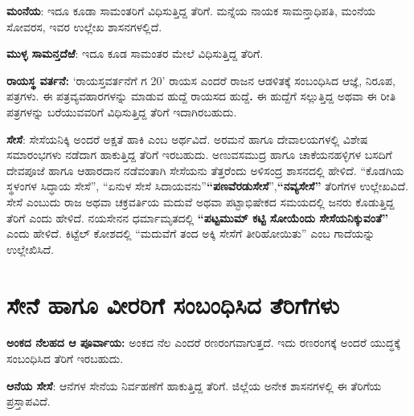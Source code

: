 \textbf{ಮಂನೆಯ}: ಇದೂ ಕೂಡಾ ಸಾಮಂತರಿಗೆ ವಿಧಿಸುತ್ತಿದ್ದ ತೆರಿಗೆ. ಮನ್ನೆಯ ನಾಯಕ ಸಾಮನ್ತಾಧಿಪತಿ, ಮಂನೆಯ ಸೋವರಸ, ಇವರ ಉಲ್ಲೇಖ ಶಾಸನಗಳಲ್ಲಿದೆ.

\textbf{ಮುಳ್ಳ ಸಾಮನ್ತದೆಱೆ}: ಇದೂ ಕೂಡ ಸಾಮಂತರ ಮೇಲೆ ವಿಧಿಸುತ್ತಿದ್ದ ತೆರಿಗೆ.

\textbf{ರಾಯಸ್ಥ ವರ್ತನೆ:} ‘ರಾಯಸ್ತವರ್ತನೆಗೆ ಗ 20’ ರಾಯಸ ಎಂದರೆ ರಾಜನ ಆಡಳಿತಕ್ಕೆ ಸಂಬಂಧಿಸಿದ ಆಜ್ಞೆ, ನಿರೂಪ, ಪತ್ರಗಳು. ಈ ಪತ್ರವ್ಯವಹಾರಗಳನ್ನು ಮಾಡುವ ಹುದ್ದೆ ರಾಯಸದ ಹುದ್ದೆ\textbf{. } ಈ ಹುದ್ದೆಗೆ ಸಲ್ಲುತ್ತಿದ್ದ ಅಥವಾ ಈ ರೀತಿ ಪತ್ರಗಳನ್ನು ಬರೆಯುವವರಿಗೆ ವಿಧಿಸುತ್ತಿದ್ದ ತೆರಿಗೆ ಇದಾಗಿರಬಹುದು.

\textbf{ಸೇಸೆ}: ಸೇಸೆಯನಿಕ್ಕಿ ಅಂದರೆ ಅಕ್ಷತೆ ಹಾಕಿ ಎಂಬ ಅರ್ಥವಿದೆ. ಅರಮನೆ ಹಾಗೂ ದೇವಾಲಯಗಳಲ್ಲಿ ವಿಶೇಷ ಸಮಾರಂಭಗಳು ನಡೆದಾಗ ಹಾಕುತ್ತಿದ್ದ ತೆರಿಗೆ ಇರಬಹುದು. ಅಣುವಸಮುದ್ರ ಹಾಗೂ ಚಾಕೆಯನಹಳ್ಳಿಗಳ ಬಸದಿಗೆ ದೇವಪೂಜೆ ಹಾಗೂ ಆಹಾರದಾನ ನಡೆವಂತಾಗಿ ಸೇಸೆಯನು ತೆತ್ತರೆಂದು ಅಳಿಸಂದ್ರ ಶಾಸನದಲ್ಲಿ ಹೇಳಿದೆ. “ಕೊಡಗಿಯ ಸ್ಥಳಂಗಳ ಸಿದ್ಧಾಯ ಸೇಸೆ”, “ಏನುಳ ಸೇಸೆ ಸಿದಾಯವನು”\textbf{“ಪಣವೆರಡುಸೇಸೆ}”,\textbf{“ನವ್ಯಸೇಸೆ”} ತೆರಿಗೆಗಳ ಉಲ್ಲೇಖವಿದೆ. ಸೇಸೆ ಎಂಬುದು ರಾಜ ಅಥವಾ ಚಕ್ರವರ್ತಿಯ ಮದುವೆ ಅಥವಾ ಪಟ್ಟಾಭಿಷೇಕದ ಸಮಯದಲ್ಲಿ ಜನರು ಕೊಡುತ್ತಿದ್ದ ತೆರಿಗೆ ಎಂದು ಹೇಳಿದೆ. ನಯಸೇನನ ಧರ್ಮಾಮೃತದಲ್ಲಿ \textbf{“ಪಟ್ಟಮುಮ್ ಕಟ್ಟಿ ಸೋಯೆಂದು ಸೇಸೆಯನಿಕ್ಕುವಂತೆ”} ಎಂದು ಹೇಳಿದೆ. ಕಿಟ್ಟೆಲ್​ ಕೋಶದಲ್ಲಿ “ಮದುವೆಗೆ ತಂದ ಅಕ್ಕಿ ಸೇಸೆಗೆ ತೀರಿಹೋಯಿತು” ಎಂಬ ಗಾದೆಯನ್ನು ಉಲ್ಲೇಖಿಸಿದೆ.


\section{ಸೇನೆ ಹಾಗೂ ವೀರರಿಗೆ ಸಂಬಂಧಿಸಿದ ತೆರಿಗೆಗಳು}

\textbf{ಅಂಕದ ನೆಲಹದ ಆ ಪೂರ್ವಾಯ:} ಅಂಕದ ನೆಲ ಎಂದರೆ ರಣರಂಗವಾಗುತ್ತದೆ. ಇದು ರಣರಂಗಕ್ಕೆ ಅಂದರೆ ಯುದ್ಧಕ್ಕೆ ಸಂಬಂಧಿಸಿದ ತೆರಿಗೆ ಇರಬಹುದು.

\textbf{ಆನೆಯ ಸೇಸೆ}: ಆನೆಗಳ ಸೇನೆಯ ನಿರ್ವಹಣೆಗೆ ಹಾಕುತ್ತಿದ್ದ ತೆರಿಗೆ. ಜಿಲ್ಲೆಯ ಅನೇಕ ಶಾಸನಗಳಲ್ಲಿ ಈ ತೆರಿಗೆಯ ಪ್ರಸ್ತಾಪವಿದೆ.

